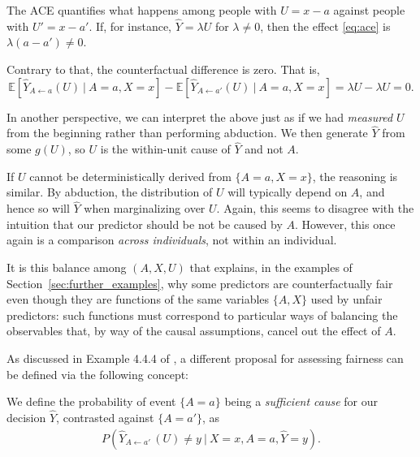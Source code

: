 The ACE quantifies what happens among people with $U = x -
a$ against people with $U' = x - a'$. If, for instance, $\hat Y =
\lambda U$ for $\lambda \neq 0$, then the effect \eqref{eq:ace}
is $\lambda(a - a') \neq 0$.

Contrary to that, the counterfactual difference is zero.
That is,
\[
\mathbb{E}[\hat Y_{A \leftarrow a}(U)\ |\ A = a, X = x] -
\mathbb{E}[\hat Y_{A \leftarrow a'}(U)\ |\ A = a, X = x] =
\lambda U - \lambda U = 0.
\]

In another perspective, we can interpret the above just as if we had
{\it measured} $U$ from the beginning rather than performing
abduction. We then generate $\hat Y$ from some $g(U)$, so $U$ is the
within-unit cause of $\hat Y$ and not $A$.

If $U$ cannot be deterministically derived from $\{A = a, X = x\}$,
the reasoning is similar. By abduction, the distribution of $U$ will
typically depend on $A$, and hence so will $\hat Y$ when marginalizing
over $U$. Again, this seems to disagree with the intuition that our
predictor should be not be caused by $A$. However, this once again is
a comparison {\it across individuals}, not within an individual. 

It is this balance among $(A, X, U)$ that explains, in the examples
of Section~\ref{sec:further_examples}, why some predictors are
counterfactually fair even though they are functions of the same
variables $\{A, X\}$ used by unfair predictors: such functions must
correspond to particular ways of balancing the observables that, by
way of the causal assumptions, cancel out the effect of $A$.

 As discussed in
Example 4.4.4 of \citet{pearl:16}, a different proposal for
assessing fairness can be defined via the following concept:
\begin{define}
  We define the probability of event $\{ A = a \}$ being a
  \emph{sufficient cause} for our
  decision $\hat Y$, contrasted against $\{ A = a' \}$, as
\begin{align}
  P(\hat Y_{A \leftarrow a'\ }(U) \neq y\ |\ X = x, A = a, \hat Y = y).
  \label{eq:sufficiency}
\end{align}
\end{define}

